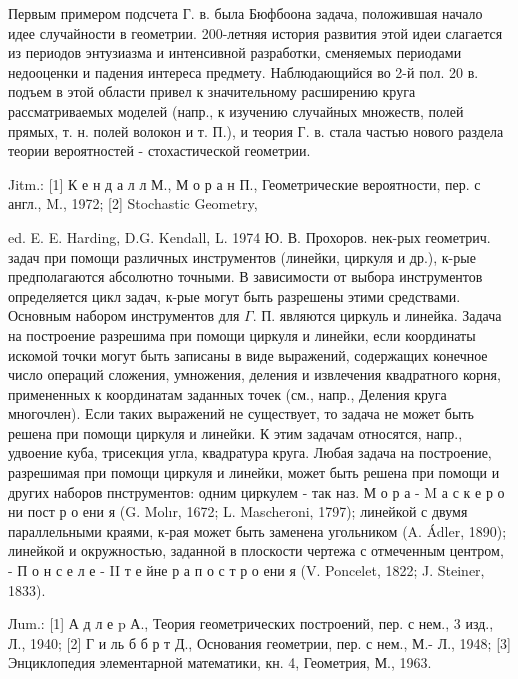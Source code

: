 \documentclass[10pt]{article}
\begin{document}
Первым примером подсчета Г. в. была Бюфбоона задача, положившая начало идее случайности в геометрии. 200-летняя история развития этой идеи слагается из периодов энтузиазма и интенсивной разработки, сменяемых периодами недооценки и падения интереса предмету. Наблюдающийся во 2-й пол. 20 в. подъем в этой области привел к значительному расширению круга рассматриваемых моделей (напр., к изучению случайных множеств, полей прямых, т. н. полей волокон и т. П.), и теория $Г$. в. стала частью нового раздела теории вероятностей - стохастической геометрии.



Jitm.: [1] К е н д а л л М., М о р а н П., Геометрические вероятности, пер. с англ., M., 1972; [2] Stochastic Geometry,



ed. E. E. Harding, D.G. Kendall, L. 1974 Ю. В. Прохоров. нек-рых геометрич. задач при помощи различных инструментов (линейки, циркуля и др.), к-рые предполагаются абсолютно точными. В зависимости от выбора инструментов определяется цикл задач, к-рые могут быть разрешены этими средствами. Основным набором инструментов для $\Gamma$. П. являются циркуль и линейка. Задача на построение разрешима при помощи циркуля и линейки, если координаты искомой точки могут быть записаны в виде выражений, содержащих конечное число операций сложения, умножения, деления и извлечения квадратного корня, примененных к координатам заданных точек (см., напр., Деления круга многочлен). Если таких выражений не существует, то задача не может быть решена при помощи циркуля и линейки. К этим задачам относятся, напр., удвоение куба, трисекция угла, квадратура круга. Любая задача на построение, разрешимая при помощи циркуля и линейки, может быть решена при помощи и других наборов пнструментов: одним циркулем - так наз. М о р а - M а с к е р о ни пост р о ени я (G. Molır, 1672; L. Mascheroni, 1797); линейкой с двумя параллельными краями, к-рая может быть заменена угольником (A. Ádler, 1890); линейкой и окружностью, заданной в плоскости чертежа с отмеченным центром, - П о н с е л е - II т е йне р а п о с т р о ени я (V. Poncelet, 1822; J. Steiner, 1833).



Лum.: [1] А д л е p А., Теория геометрических построений, пер. с нем., 3 изд., Л., 1940; [2] Г и ль б б р т Д., Основания геометрии, пер. с нем., М.- Л., 1948; [3] Энциклопедия элементарной математики, кн. 4, Геометрия, М., 1963.
\end{document}
